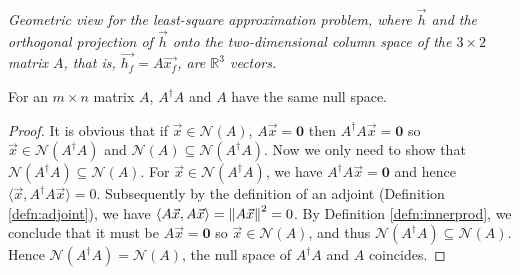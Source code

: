  \\
\textit{Geometric view for the least-square approximation problem, where $\vec{h}$ and the orthogonal projection of $\vec{h}$ onto the two-dimensional column space of the $3 \times 2$ matrix $A$, that is, $\vec{h_f} = A\vec{x_f}$, are $\mathbb{R}^3$ vectors.}\par

\begin{proper}
For an $m \times n$ matrix $A$, $A^\dag A$ and $A$ have the same null space.
\end{proper}
\begin{proof}
It is obvious that if $\vec{x} \in \mathcal{N}(A)$, $A\vec{x} = \textbf{0}$ then $A^\dag A\vec{x} = \textbf{0}$ so $\vec{x} \in \mathcal{N}(A^\dag A)$ and $\mathcal{N}(A) \subseteq \mathcal{N}(A^\dag A)$. Now we only need to show that $\mathcal{N}(A^\dag A) \subseteq \mathcal{N}(A)$. For $\vec{x} \in \mathcal{N}(A^\dag A)$, we have $A^\dag A\vec{x} = \textbf{0}$ and hence $\langle \vec{x}, A^\dag A\vec{x} \rangle = 0$. Subsequently by the definition of an adjoint (Definition \ref{defn:adjoint}), we have $\langle A\vec{x}, A\vec{x} \rangle = \norm{A\vec{x}}^2 = 0$. By Definition \ref{defn:innerprod}, we conclude that it must be $A\vec{x} = \textbf{0}$ so $\vec{x} \in \mathcal{N}(A)$, and thus $\mathcal{N}(A^\dag A) \subseteq \mathcal{N}(A)$. Hence $\mathcal{N}(A^\dag A) = \mathcal{N}(A)$, the null space of $A^\dag A$ and $A$ coincides.
\end{proof}

